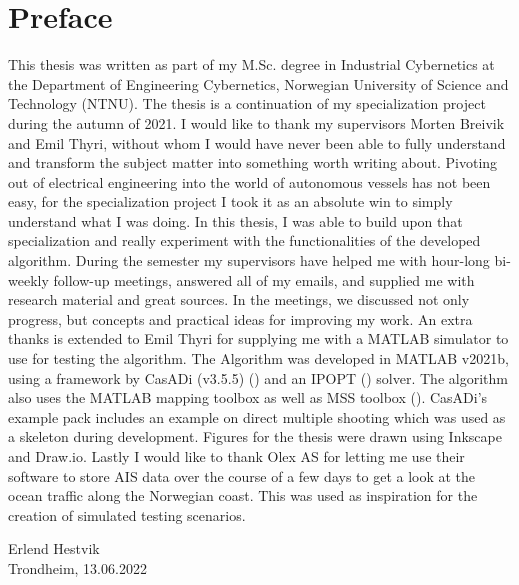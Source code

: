 \blankpage
\section*{Preface}

This thesis was written as part of my M.Sc. degree in Industrial Cybernetics
at the Department of Engineering Cybernetics, Norwegian University of Science
and Technology (NTNU). The thesis is a continuation of my specialization project during the autumn of 2021.
I would like to thank my supervisors Morten Breivik and Emil Thyri, without whom I would have
never been able to fully understand and transform the subject matter into something worth writing about.\newline
Pivoting out of electrical engineering into the world of autonomous vessels has not been easy, for
the specialization project I took it as an absolute win to simply understand what I was doing. In this 
thesis, I was able to build upon that specialization and really experiment with the functionalities of the developed
algorithm.\newline
During the semester my supervisors have helped me with hour-long bi-weekly follow-up meetings, answered
all of my emails, and supplied me with research material and great sources. In the meetings, we discussed
not only progress, but concepts and practical ideas for improving my work.\newline
An extra thanks is extended to Emil Thyri for supplying me with a MATLAB simulator to use for testing the algorithm.
The Algorithm was developed in MATLAB v2021b, using a framework by CasADi (v3.5.5) (\cite{andersson2019casadi}) and an IPOPT (\cite{wachter2006implementation}) solver. The algorithm
also uses the MATLAB mapping toolbox as well as MSS toolbox (\cite{MSStoolbox}). CasADi's example pack includes an example on 
direct multiple shooting which was used as a skeleton during development. Figures for the thesis were drawn
using Inkscape and Draw.io. Lastly I would like to thank Olex AS for letting me use their software to store AIS data
over the course of a few days to get a look at the ocean traffic along the Norwegian coast. This was used as inspiration
for the creation of simulated testing scenarios.


\begin{center}
    Erlend Hestvik\\
    Trondheim, 13.06.2022
\end{center}

\afterpage{\blankpage}